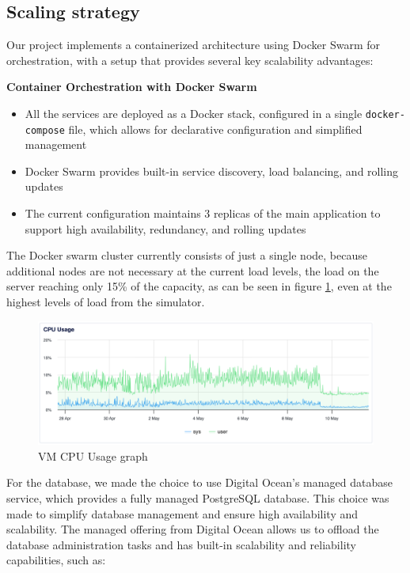\subsection{Scaling strategy}
Our project implements a containerized architecture using Docker Swarm for orchestration, with a setup that provides several key scalability advantages:

\textbf{Container Orchestration with Docker Swarm}
    \begin{itemize}
        \item All the services are deployed as a Docker stack, configured in a single \texttt{docker-compose} file, which allows for declarative configuration and simplified management
        \item Docker Swarm provides built-in service discovery, load balancing, and rolling updates
        \item The current configuration maintains 3 replicas of the main application to support high availability, redundancy, and rolling updates
    \end{itemize}

The Docker swarm cluster currently consists of just a single node, because additional nodes are not necessary at the current load levels, the load on the server reaching only 15\% of the capacity, as can be seen in figure \ref{fig:cpu_usage}, even at the highest levels of load from the simulator.
 \begin{figure}
    \centering
    \includegraphics[width=1\linewidth]{images/CPU-Usage.png}
    \caption{VM CPU Usage graph}
    \label{fig:cpu_usage}
\end{figure}
For the database, we made the choice to use Digital Ocean's managed database service, which provides a fully managed PostgreSQL database. This choice was made to simplify database management and ensure high availability and scalability. The managed offering from Digital Ocean allows us to offload the database administration tasks and has built-in scalability and reliability capabilities, such as:

